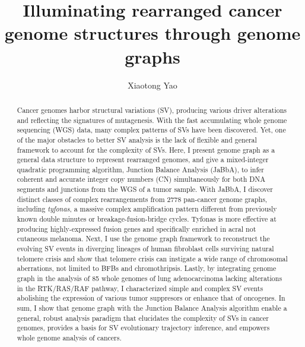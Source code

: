 \documentclass[phd,tocprelim]{cornell}
\title{Illuminating rearranged cancer genome structures through genome graphs}
\author {Xiaotong Yao}
\begin{document}
\maketitle
\makecopyright

\begin{abstract}
    Cancer genomes harbor structural variations (SV), producing various driver alterations and reflecting the signatures of mutagenesis. With the fast accumulating whole genome sequencing (WGS) data, many complex patterns of SVs have been discovered. Yet, one of the major obstacles to better SV analysis is the lack of flexible and general framework to account for the complexity of SVs. Here, I present genome graph as a general data structure to represent rearranged genomes, and give a mixed-integer quadratic programming algorithm, Junction Balance Analysis (JaBbA), to infer coherent and accurate integer copy numbers (CN) simultaneously for both DNA segments and junctions from the WGS of a tumor sample. With JaBbA, I discover distinct classes of complex rearrangements from 2778 pan-cancer genome graphs, including \textit{tyfonas}, a massive complex amplification pattern different from previously known double minutes or breakage-fusion-bridge cycles. Tyfonas is more effective at producing highly-expressed fusion genes and specifically enriched in acral not cutaneous melanoma. Next, I use the genome graph framework to reconstruct the evolving SV events in diverging lineages of human fibroblast cells surviving natural telomere crisis and show that telomere crisis can instigate a wide range of chromosomal aberrations, not limited to BFBs and chromothripsis. Lastly, by integrating genome graph in the analysis of 85 whole genomes of lung adenocarcinoma lacking alterations in the RTK/RAS/RAF pathway, I characterized simple and complex SV events abolishing the expression of various tumor suppresors or enhance that of oncogenes. In sum, I show that genome graph with the Junction Balance Analysis algorithm enable a general, robust analysis paradigm that elucidates the complexity of SVs in cancer genomes, provides a basis for SV evolutionary trajectory inference, and empowers whole genome analysis of cancers.

\end{abstract}
\end{document}
